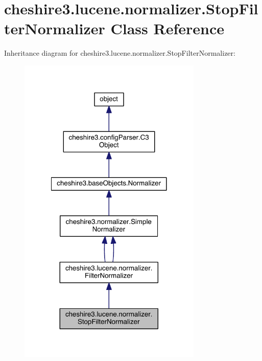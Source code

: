 \hypertarget{classcheshire3_1_1lucene_1_1normalizer_1_1_stop_filter_normalizer}{\section{cheshire3.\-lucene.\-normalizer.\-Stop\-Filter\-Normalizer Class Reference}
\label{classcheshire3_1_1lucene_1_1normalizer_1_1_stop_filter_normalizer}
}


Inheritance diagram for cheshire3.\-lucene.\-normalizer.\-Stop\-Filter\-Normalizer\-:
\nopagebreak
\begin{figure}[H]
\begin{center}
\leavevmode
\includegraphics[width=248pt]{classcheshire3_1_1lucene_1_1normalizer_1_1_stop_filter_normalizer__inherit__graph}
\end{center}
\end{figure}


